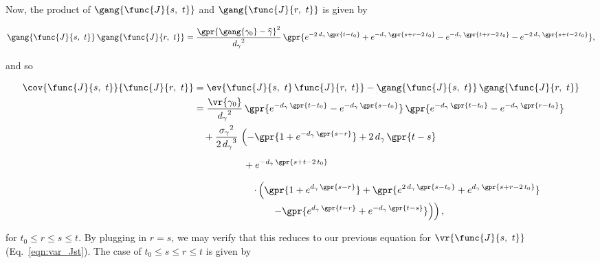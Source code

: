 Now, the product of $\gang{\func{J}{s,\ t}}$ and $\gang{\func{J}{r,\ t}}$ is given by

\begin{equation}
    \gang{\func{J}{s,\ t}}\,\gang{\func{J}{r,\ t}} = \frac{\gpr{\gang{\gamma_0} - \widehat{\gamma}}^2}{{d_{\gamma}}^2}\,\gpr{e^{-2\,d_{\gamma}\,\gpr{t - t_0}} + e^{-d_{\gamma}\,\gpr{s + r - 2\,t_0}} - e^{-d_{\gamma}\,\gpr{t + r - 2\,t_0}} - e^{-2\,d_{\gamma}\,\gpr{s + t - 2\,t_0}}},
\end{equation}

and so

\begin{align}
    \cov{\func{J}{s,\ t}}{\func{J}{r,\ t}} &= \ev{\func{J}{s,\ t}\,\func{J}{r,\ t}} - \gang{\func{J}{s,\ t}}\,\gang{\func{J}{r,\ t}} \nonumber \\
    	&= \frac{\vr{\gamma_0}}{{d_{\gamma}}^2}\,\gpr{e^{-d_{\gamma}\,\gpr{t - t_0}} - e^{-d_{\gamma}\,\gpr{s - t_0}}}\,\gpr{e^{-d_{\gamma}\,\gpr{t - t_0}} - e^{-d_{\gamma}\,\gpr{r - t_0}}}  \nonumber \\
    		&\quad + \frac{{\sigma_{\gamma}}^2}{{2\,d_{\gamma}}^{3}}\,\left( -\gpr{1 + e^{-d_{\gamma}\,\gpr{s - r}}} + 2\,d_{\gamma}\,\gpr{t - s} \right. \nonumber \\
    		&\phantom{+ \frac{{\sigma_{\gamma}}^2}{{2\,d_{\gamma}}^{3}}}\qquad + e^{-d_{\gamma}\,\gpr{s + t - 2\,t_0}} \nonumber \\
    		&\qquad\qquad\qquad  \left. \cdot \left( \gpr{1 + e^{d_{\gamma}\,\gpr{s - r}}} + \gpr{e^{2\,d_{\gamma}\,\gpr{s - t_0}} + e^{d_{\gamma}\,\gpr{s + r - 2\,t_0}}} \right. \right. \nonumber \\
    		&\qquad\qquad\qquad\qquad \left.\left. - \gpr{e^{d_{\gamma}\,\gpr{t - r}} + e^{-d_{\gamma}\,\gpr{t - s}}} \right) \right), \label{eqn:cov_Jst_Jrt_r_le_s}
\end{align}

for $t_0 \leq r \leq s \leq t$. By plugging in $r = s$, we may verify that this reduces to our previous equation for $\vr{\func{J}{s,\ t}}$ (Eq.~\ref{eqn:var_Jst}). The case of $t_0 \leq s \leq r \leq t$ is given by

